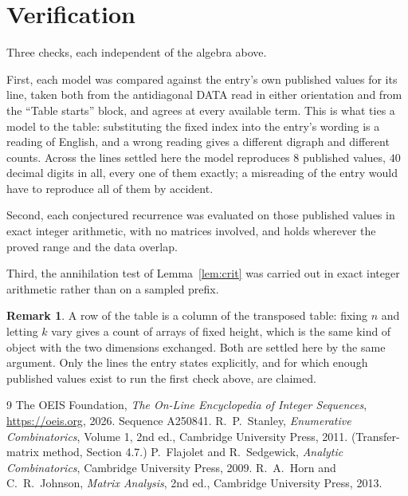 \documentclass[11pt,a4paper]{article}
\theoremstyle{plain}
\theoremstyle{definition}
\newtheorem{remark}[theorem]{Remark}
\begin{document}
\section{Verification}

Three checks, each independent of the algebra above.

First, each model was compared against the entry's own published values for its line, taken
both from the antidiagonal DATA read in either orientation and from the ``Table starts''
block, and agrees at every available term. This is what ties a model to the table:
substituting the fixed index into the entry's wording is a reading of English, and a wrong
reading gives a different digraph and different counts. Across the lines settled here the
model reproduces $8$ published values, $40$ decimal digits in all, every one of
them exactly; a misreading of the entry would have to reproduce all of them by accident.

Second, each conjectured recurrence was evaluated on those published values in exact
integer arithmetic, with no matrices involved, and holds wherever the proved range and the
data overlap.

Third, the annihilation test of Lemma~\ref{lem:crit} was carried out in exact integer
arithmetic rather than on a sampled prefix.

\begin{remark}
A row of the table is a column of the transposed table: fixing $n$ and letting $k$ vary gives a
count of arrays of fixed height, which is the same kind of object with the two dimensions
exchanged. Both are settled here by the same argument. Only the lines the entry states
explicitly, and for which enough published values exist to run the first check above, are
claimed.
\end{remark}

\begin{thebibliography}{9}
 The OEIS Foundation, \emph{The On-Line Encyclopedia of Integer
Sequences}, \url{https://oeis.org}, 2026. Sequence A250841.
 R.~P.~Stanley, \emph{Enumerative Combinatorics}, Volume 1, 2nd ed.,
Cambridge University Press, 2011. (Transfer-matrix method, Section 4.7.)
 P.~Flajolet and R.~Sedgewick, \emph{Analytic Combinatorics}, Cambridge
University Press, 2009.
 R.~A.~Horn and C.~R.~Johnson, \emph{Matrix Analysis}, 2nd ed., Cambridge
University Press, 2013.
\end{thebibliography}
\end{document}

